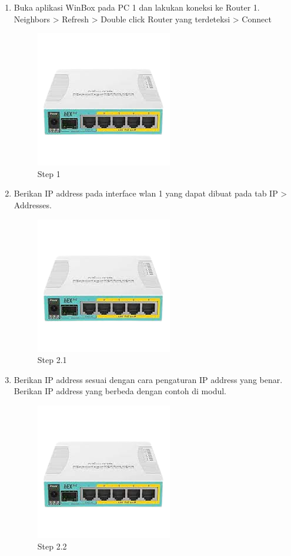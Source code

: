 \begin{enumerate}
	\item Buka aplikasi WinBox pada PC 1 dan lakukan koneksi ke Router 1.
	\\Neighbors > Refresh > Double click Router yang terdeteksi > Connect
	\begin{figure}[H]
		\centering
		\includegraphics[width=0.5\linewidth]{P1/img/contoh.png}
		\caption{Step 1}
		\label{fig:gambar1}
	\end{figure}

	\item Berikan IP address pada interface wlan 1 yang dapat dibuat pada tab IP > Addresses.
	\begin{figure}[H]
		\centering
		\includegraphics[width=0.5\linewidth]{P1/img/contoh.png}
		\caption{Step 2.1}
		\label{fig:gambar2}
	\end{figure}

	\item Berikan IP address sesuai dengan cara pengaturan IP address yang benar. Berikan IP address
	yang berbeda dengan contoh di modul.
	\begin{figure}[H]
		\centering
		\includegraphics[width=0.5\linewidth]{P1/img/contoh.png}
		\caption{Step 2.2}
		\label{fig:gambar3}
	\end{figure}


\end{enumerate}
